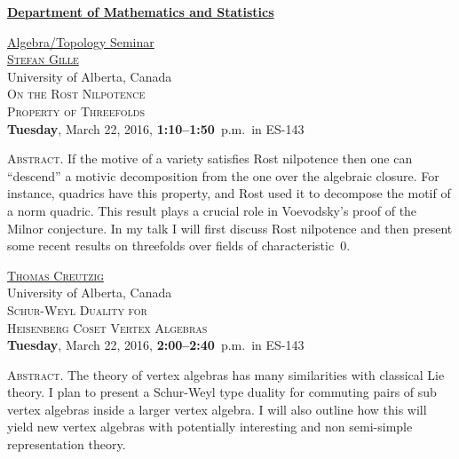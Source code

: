 \documentclass[12pt]{article}
\begin{document}
\thispagestyle{empty}

\noindent\hspace{-28pt}\raisebox{-19pt}{\XeTeXpicfile UAlogo.jpg scaled 340}%
\hfill\textsf{\textbf{\footnotesize\href{http://www.albany.edu/math/}{Department of Mathematics and Statistics}}}\bigskip

\begin{center}\Large
  \textsf{\huge \href{http://www.albany.edu/~mv312143/seminar/}{Algebra/Topology Seminar}}\\[2.5\bigskipamount]
  \textsc{\LARGE\href{http://www.math.ualberta.ca/~gille/}{Stefan Gille}}\\
  University of Alberta, Canada\\[1.5\bigskipamount]
  \textsc{\LARGE On the Rost Nilpotence\\ Property of Threefolds}\\[1.5\bigskipamount]
  \textbf{Tuesday}, March 22, 2016, \textbf{1:10--1:50}~p.m.\ in ES-143\\[1.5\bigskipamount]
\end{center}

\noindent\large\textsc{Abstract.}
If the motive of a variety satisfies Rost nilpotence then one can ``descend'' a motivic decomposition from the one over the algebraic closure. For instance, quadrics have this property, and Rost used it to decompose the motif of a norm quadric. This result plays a crucial role in Voevodsky's proof of the Milnor conjecture. In my talk I will first discuss Rost nilpotence and then present some recent results on threefolds over fields of characteristic~0.
\bigskip

\noindent\hrulefill\bigskip
\begin{center}\Large
  \textsc{\LARGE\href{http://www.ualberta.ca/~creutzig/}{Thomas Creutzig}}\\
  University of Alberta, Canada\\[1.5\bigskipamount]
  \textsc{\LARGE Schur-Weyl Duality for\\ Heisenberg Coset Vertex Algebras}\\[1.5\bigskipamount]
  \textbf{Tuesday}, March 22, 2016, \textbf{2:00--2:40}~p.m.\ in ES-143\\[1.5\bigskipamount]
\end{center}

\noindent\large\textsc{Abstract.}
The theory of vertex algebras has many similarities with classical Lie theory. I plan to present a Schur-Weyl type duality for commuting pairs of sub vertex algebras inside a larger vertex algebra. I will also outline how this will yield new vertex algebras with potentially interesting and non semi-simple representation theory.
\end{document}
